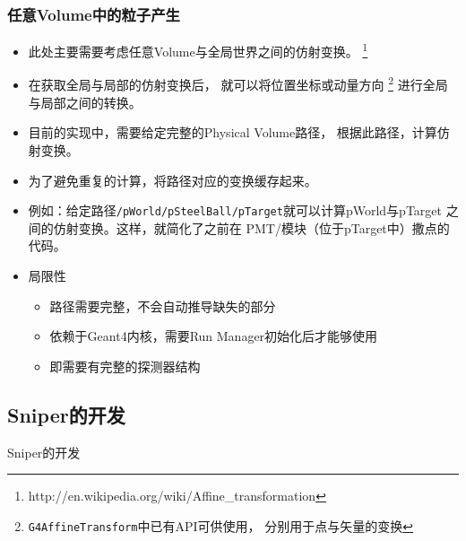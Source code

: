 \begin{frame}
    \frametitle{任意Volume中的粒子产生}
    \begin{itemize}
        \item 此处主要需要考虑任意Volume与全局世界之间的仿射变换。
                \footnote{http://en.wikipedia.org/wiki/Affine\_transformation}
        \item 在获取全局与局部的仿射变换后，
              就可以将位置坐标或动量方向
              \footnote{{\tt G4AffineTransform}中已有API可供使用，
                        分别用于点与矢量的变换}
              进行全局与局部之间的转换。
        \item 目前的实现中，需要给定完整的Physical Volume路径，
              根据此路径，计算仿射变换。
        \item 为了避免重复的计算，将路径对应的变换缓存起来。
        \item 例如：给定路径{\tt /pWorld/pSteelBall/pTarget}就可以计算pWorld与pTarget
              之间的仿射变换。这样，就简化了之前在
              PMT/模块（位于pTarget中）撒点的代码。
        \item 局限性
            \begin{itemize}
                \item 路径需要完整，不会自动推导缺失的部分
                \item 依赖于Geant4内核，需要Run Manager初始化后才能够使用
                \item 即需要有完整的探测器结构
            \end{itemize}
    \end{itemize}
\end{frame}

\subsection{Sniper的开发}

\begin{frame}
    \begin{center}
        \Large Sniper的开发
    \end{center}
\end{frame}

